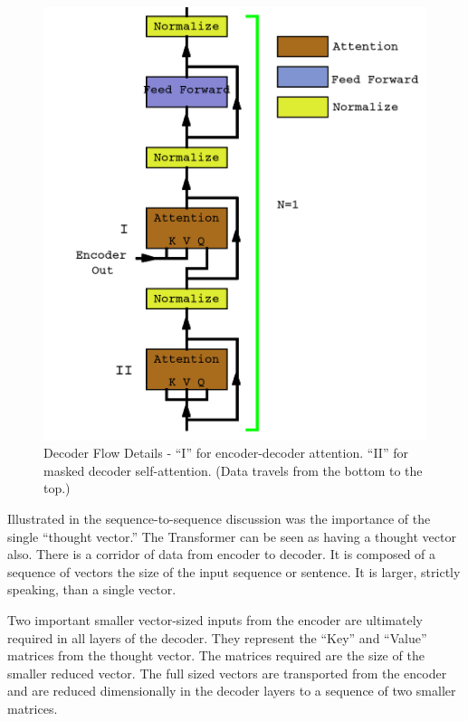 \begin{figure}[H]
	\begin{center}
		
		
		\includegraphics[scale=1.25]{diagram-flow-decoder02}
	\end{center}
	\caption[Decoder Flow]{Decoder Flow Details - ``I'' for encoder-decoder attention. ``II'' for masked decoder self-attention. (Data travels from the bottom to the top.)}
	
	
\end{figure}


Illustrated in the sequence-to-sequence discussion was the importance of the single ``thought vector.'' The Transformer can be seen as having a thought vector also. There is a corridor of data from encoder to decoder. It is composed of a sequence of vectors the size of the input sequence or sentence. It is larger, strictly speaking, than a single vector.

Two important smaller vector-sized inputs from the encoder are ultimately required in all layers of the decoder. They represent the ``Key'' and ``Value'' matrices from the thought vector. The matrices required are the size of the smaller reduced vector. The full sized vectors are transported from the encoder and are reduced dimensionally in the decoder layers to a sequence of two smaller matrices. 

